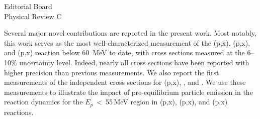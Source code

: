 \documentclass{letter} %
\begin{document}
\begin{letter}{
Editorial Board \\
Physical Review C}


\noindent Several major novel contributions are reported in the present work. Most notably, this work serves as the most well-characterized measurement of the (p,x), (p,x), and (p,x) reaction below 60~MeV to date, with cross sections measured  at the 6--10\% uncertainty level. 
Indeed, nearly all cross sections 
have been reported with higher precision than previous measurements.
We also report  the first measurements of the independent cross sections for (p,x), , and . 
We  use these measurements to illustrate the impact of pre-equilibrium particle emission in the reaction dynamics for the $E_p$~\textless~55\,MeV region in (p,x),  (p,x), and (p,x) reactions.



\end{letter}
\end{document}
